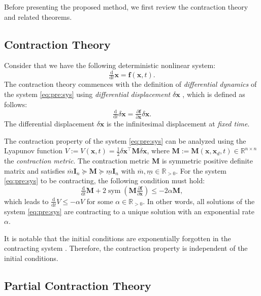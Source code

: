 \documentclass{ifacconf}
\newcommand{\ctxt}[2]{{\color{#1}{#2}\color{black}}}
\newcommand{\cred}[1]{{\ctxt{awesome}{#1}}}
\newcommand\R{\mathbb{R}}
\newcommand*{\mv}[1]{\boldsymbol{#1}} %
\newcommand*{\mm}[1]{\boldsymbol{#1}} %
\DeclareMathOperator{\mysym}{sym}       %
\newcommand\der{\mathrm d}
\newcommand*{\ddtt}{
   \tfrac{\der}{\der t}
}
\newcommand*{\pptfrac}[2]{
   \tfrac{\partial {#1}}{\partial {#2}}
}
\begin{document}
Before presenting the proposed method, we first review the contraction theory and related theorems.

\subsection{Contraction Theory} \label{sec:sub:contraction}

Consider that we have the following deterministic nonlinear system:
\begin{equation} \label{eq:pre:sys}
   \ddtt\mv{x}
   =
   \mv{f}(\mv{x},t)
   .
\end{equation}
The contraction theory commences with the definition of \textit{differential dynamics} of the system \eqref{eq:pre:sys} using \textit{differential displacement} $\delta\mv{x}$ \cite[Chap 4]{Kirk:2004aa}, which is defined as follows:
\begin{equation}
   \ddtt{\delta\mv{x}}
   =
   \pptfrac{\mv{f}}{\mv{x}} \delta\mv{x}
   .
\end{equation}
The differential displacement $\delta\mv{x}$ is the infinitesimal displacement at \textit{fixed time}.

The contraction property of the system \eqref{eq:pre:sys} can be analyzed using the Lyapunov function $V:=V(\mv{x},t)=\tfrac{1}{2}\delta\mv{x}^\top \mm{M} \delta\mv{x}$, where $\mm{M}:=\mm{M}(\mv{x},\mv{x}_d,t)\in\R^{n\times n}$ the \textit{contraction metric}.
The contraction metric $\mm{M}$ is symmetric positive definite matrix and satisfies $\overline{m}\mm{I}_n\succeq\mm{M}\succeq\underline{m}\mm{I}_n$ with $\overline{m},\underline{m}\in\R_{>0}$.
For the system \eqref{eq:pre:sys} to be contracting, the following condition must hold:
\begin{equation} \label{eq:pre:contraction:condition}
   \ddtt\mm{M} 
   + 
   2\mysym(
      \mm{M} \pptfrac{\mv{f}}{\mv{x}}
   ) 
   \leq 
   -2\alpha\mm{M}
   ,
\end{equation}
which leads to $\ddtt V \leq -\alpha V$ for some $\alpha\in\R_{>0}$.
In other words, all solutions of the system \eqref{eq:pre:sys} are contracting to a unique solution with an exponential rate $\alpha$.

It is notable that the initial conditions are exponentially forgotten in the contracting system \cite{LOHMILLER:1998aa}.
Therefore, the contraction property is independent of the initial conditions.

\cred{global?? 하다는것도 쓸까?}

\subsection{Partial Contraction Theory} \label{sec:sub:contraction:partial}
\end{document}
